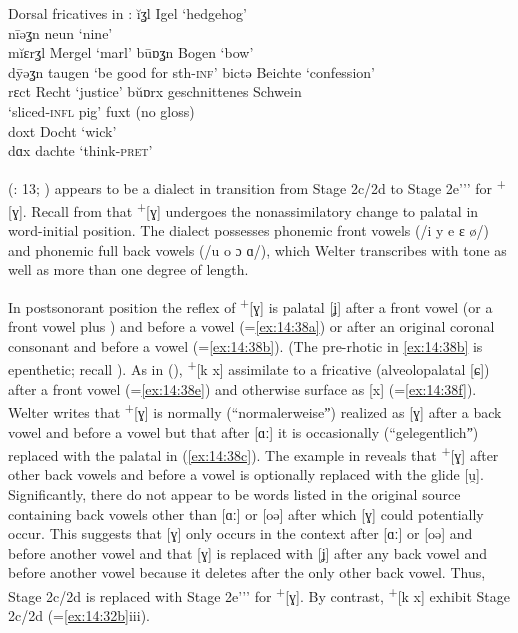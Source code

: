 \ea%
\label{ex:14:37}Dorsal fricatives in :
\ea\label{ex:14:37a} ĭʓl \tab [ɪʝl̩] \tab  Igel \tab ‘hedgehog’ \\
    nīəʓn \tab  [niːəʝn̩] \tab neun \tab  ‘nine’ \\
\ex\label{ex:14:37b} mĭɛrʓl \tab [mɪɛrʝl̩] \tab Mergel \tab ‘marl’ 
\ex\label{ex:14:37c} būɒʓn \tab [buːɒʝn̩] \tab  Bogen \tab ‘bow’ \\
    d\={y}əʓn \tab [dyːəʝn̩] \tab taugen \tab ‘be good for sth\textsc{{}-inf}’ 
\ex\label{ex:14:37d} bictə \tab [biçtə] \tab Beichte \tab ‘confession’ \\
    rɛct \tab [rɛçt] \tab  Recht \tab ‘justice’ 
\ex\label{ex:14:37e} bŭɒrx \tab [buɐrx] \tab geschnittenes Schwein\\
\tab \tab \tab ‘sliced-\textsc{infl} pig’ 
\ex\label{ex:14:37f} fuxt \tab [fuxt]  \tab  (no gloss) \tab  {}\\
    doxt \tab [doxt] \tab Docht \tab ‘wick’ \\
    dɑx \tab [dɑx] \tab  dachte \tab ‘think\textsc{{}-pret}’ 
    \z 
\z

 (\citealt{Welter1938}: 13; ) appears to be a dialect in transition from Stage 2c/2d to Stage 2e{}'{}'{}' for  \textsuperscript{+}[ɣ]. Recall from  that  \textsuperscript{+}[ɣ] undergoes the nonassimilatory change to palatal in word-initial position. The dialect possesses phonemic front vowels (/i y e ɛ ø/) and phonemic full back vowels (/u o ɔ ɑ/), which Welter transcribes with tone as well as more than one degree of length.

In postsonorant position the reflex of  \textsuperscript{+}[ɣ] is palatal [ʝ] after a front vowel (or a front vowel plus ) and before a vowel (=\ref{ex:14:38a}) or after an original coronal consonant and before a vowel (=\ref{ex:14:38b}). (The pre-rhotic  in \ref{ex:14:38b} is epenthetic; recall ). As in  (),  \textsuperscript{+}[k x] assimilate to a  fricative (alveolopalatal [ɕ]) after a front vowel (=\ref{ex:14:38e}) and otherwise surface as [x] (=\ref{ex:14:38f}). Welter writes that  \textsuperscript{+}[ɣ] is normally (“normalerweiseˮ) realized as [ɣ] after a back vowel and before a vowel but that after [ɑː] it is occasionally (“gelegentlichˮ) replaced with the palatal in (\ref{ex:14:38c}). The example in  reveals that  \textsuperscript{+}[ɣ] after other back vowels and before a vowel is optionally replaced with the glide [u̯]. Significantly, there do not appear to be words listed in the original source containing back vowels other than [ɑː] or [oə] after which [ɣ] could potentially occur. This suggests that [ɣ] only occurs in the context after [ɑː] or [oə] and before another vowel and that [ɣ] is replaced with [ʝ] after any back vowel and before another vowel because it deletes after the only other back vowel. Thus, Stage 2c/2d is replaced with Stage 2e{}'{}'{}' for  \textsuperscript{+}[ɣ]. By contrast,  \textsuperscript{+}[k x] exhibit Stage 2c/2d (=\ref{ex:14:32b}iii).

